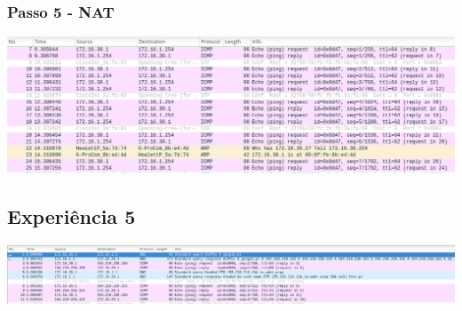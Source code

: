 \documentclass[a4paper]{article}
\begin{document}
\subsubsection{Passo 5 - NAT}

\includegraphics[scale=0.35]{Exp4-5-NAT.png}

\subsection{Experiência 5}

\includegraphics[scale=0.30]{Exp5-DNS.png}
\end{document}

